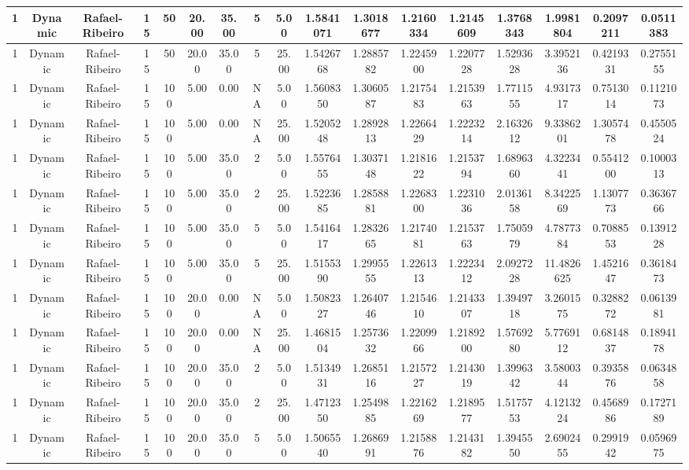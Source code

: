 \begin{longtable}{ | c | c | c | c | c | c | c | c | c | c | c | c | c | c | c | c | c | }
	\hline
	1	&	Dynamic	&	Rafael-Ribeiro	&	15	&	50	&	20.00	&	35.00	&	5	&	5.00	&	1.5841071	&	1.3018677	&	1.2160334	&	1.2145609	&	1.3768343	&	1.9981804	&	0.2097211	&	0.0511383 \\
	\hline
	1	&	Dynamic	&	Rafael-Ribeiro	&	15	&	50	&	20.00	&	35.00	&	5	&	25.00	&	1.5426768	&	1.2885782	&	1.2245900	&	1.2207728	&	1.5293628	&	3.3952136	&	0.4219331	&	0.2755155 \\
	\hline
	1	&	Dynamic	&	Rafael-Ribeiro	&	15	&	100	&	5.00	&	0.00	&	NA	&	5.00	&	1.5608350	&	1.3060587	&	1.2175483	&	1.2153963	&	1.7711555	&	4.9317317	&	0.7513014	&	0.1121073 \\
	\hline
	1	&	Dynamic	&	Rafael-Ribeiro	&	15	&	100	&	5.00	&	0.00	&	NA	&	25.00	&	1.5205248	&	1.2892813	&	1.2266429	&	1.2223214	&	2.1632612	&	9.3386201	&	1.3057478	&	0.4550524 \\
	\hline
	1	&	Dynamic	&	Rafael-Ribeiro	&	15	&	100	&	5.00	&	35.00	&	2	&	5.00	&	1.5576455	&	1.3037148	&	1.2181622	&	1.2153794	&	1.6896360	&	4.3223441	&	0.5541200	&	0.1000313 \\
	\hline
	1	&	Dynamic	&	Rafael-Ribeiro	&	15	&	100	&	5.00	&	35.00	&	2	&	25.00	&	1.5223685	&	1.2858881	&	1.2268300	&	1.2231036	&	2.0136158	&	8.3422569	&	1.1307773	&	0.3636766 \\
	\hline
	1	&	Dynamic	&	Rafael-Ribeiro	&	15	&	100	&	5.00	&	35.00	&	5	&	5.00	&	1.5416417	&	1.2832665	&	1.2174081	&	1.2153763	&	1.7505979	&	4.7877384	&	0.7088553	&	0.1391228 \\
	\hline
	1	&	Dynamic	&	Rafael-Ribeiro	&	15	&	100	&	5.00	&	35.00	&	5	&	25.00	&	1.5155390	&	1.2995555	&	1.2261313	&	1.2223412	&	2.0927228	&	11.4826625	&	1.4521647	&	0.3618473 \\
	\hline
	1	&	Dynamic	&	Rafael-Ribeiro	&	15	&	100	&	20.00	&	0.00	&	NA	&	5.00	&	1.5082327	&	1.2640746	&	1.2154610	&	1.2143307	&	1.3949718	&	3.2601575	&	0.3288272	&	0.0613981 \\
	\hline
	1	&	Dynamic	&	Rafael-Ribeiro	&	15	&	100	&	20.00	&	0.00	&	NA	&	25.00	&	1.4681504	&	1.2573632	&	1.2209966	&	1.2189200	&	1.5769280	&	5.7769112	&	0.6814837	&	0.1894178 \\
	\hline
	1	&	Dynamic	&	Rafael-Ribeiro	&	15	&	100	&	20.00	&	35.00	&	2	&	5.00	&	1.5134931	&	1.2685116	&	1.2157227	&	1.2143019	&	1.3996342	&	3.5800344	&	0.3935876	&	0.0634858 \\
	\hline
	1	&	Dynamic	&	Rafael-Ribeiro	&	15	&	100	&	20.00	&	35.00	&	2	&	25.00	&	1.4712350	&	1.2549885	&	1.2216269	&	1.2189577	&	1.5175753	&	4.1213224	&	0.4568986	&	0.1727189 \\
	\hline
	1	&	Dynamic	&	Rafael-Ribeiro	&	15	&	100	&	20.00	&	35.00	&	5	&	5.00	&	1.5065540	&	1.2686991	&	1.2158876	&	1.2143182	&	1.3945550	&	2.6902455	&	0.2991942	&	0.0596975 \\

\end{longtable}
